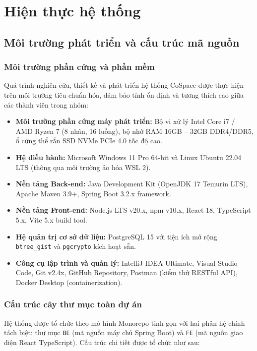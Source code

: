 \section{Hiện thực hệ thống}

\subsection{Môi trường phát triển và cấu trúc mã nguồn}

\subsubsection{Môi trường phần cứng và phần mềm}

Quá trình nghiên cứu, thiết kế và phát triển hệ thống CoSpace được thực hiện trên môi trường tiêu chuẩn hóa, đảm bảo tính ổn định và tương thích cao giữa các thành viên trong nhóm:

\begin{itemize}
    \item \textbf{Môi trường phần cứng máy phát triển:} Bộ vi xử lý Intel Core i7 / AMD Ryzen 7 (8 nhân, 16 luồng), bộ nhớ RAM 16GB -- 32GB DDR4/DDR5, ổ cứng thể rắn SSD NVMe PCIe 4.0 tốc độ cao.
    \item \textbf{Hệ điều hành:} Microsoft Windows 11 Pro 64-bit và Linux Ubuntu 22.04 LTS (thông qua môi trường ảo hóa WSL 2).
    \item \textbf{Nền tảng Back-end:} Java Development Kit (OpenJDK 17 Temurin LTS), Apache Maven 3.9+, Spring Boot 3.2.x framework.
    \item \textbf{Nền tảng Front-end:} Node.js LTS v20.x, npm v10.x, React 18, TypeScript 5.x, Vite 5.x build tool.
    \item \textbf{Hệ quản trị cơ sở dữ liệu:} PostgreSQL 15 với tiện ích mở rộng \texttt{btree\_gist} và \texttt{pgcrypto} kích hoạt sẵn.
    \item \textbf{Công cụ lập trình và quản lý:} IntelliJ IDEA Ultimate, Visual Studio Code, Git v2.4x, GitHub Repository, Postman (kiểm thử RESTful API), Docker Desktop (containerization).
\end{itemize}

\subsubsection{Cấu trúc cây thư mục toàn dự án}

Hệ thống được tổ chức theo mô hình Monorepo tinh gọn với hai phân hệ chính tách biệt: thư mục \texttt{BE} (mã nguồn máy chủ Spring Boot) và \texttt{FE} (mã nguồn giao diện React TypeScript). Cấu trúc chi tiết được tổ chức như sau:

